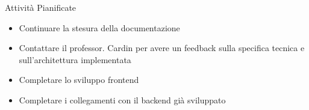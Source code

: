 \documentclass{beamer}
\begin{document}
\begin{frame}
    \begin{block}{Attività Pianificate}
        \begin{itemize}
            \item Continuare la stesura della documentazione
            \item Contattare il professor. Cardin per avere un feedback sulla specifica tecnica e sull’architettura implementata
            \item Completare lo sviluppo frontend 
            \item Completare i collegamenti con il backend già sviluppato
        \end{itemize}
    \end{block}
\end{frame}


\end{document}
